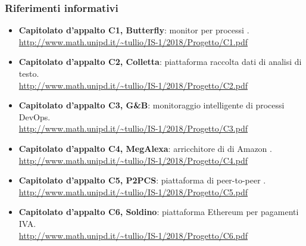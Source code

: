         \subsubsection{Riferimenti informativi}
            \begin{itemize}
                \item \textbf{Capitolato d'appalto C1, Butterfly}:
                    monitor per processi . \\
                    \url{http://www.math.unipd.it/~tullio/IS-1/2018/Progetto/C1.pdf}
                \item \textbf{Capitolato d'appalto C2, Colletta}:
                    piattaforma raccolta dati di analisi di testo. \\
                    \url{http://www.math.unipd.it/~tullio/IS-1/2018/Progetto/C2.pdf}
                \item \textbf{Capitolato d'appalto C3, G\&B}:
                    monitoraggio intelligente di processi DevOps. \\
                    \url{http://www.math.unipd.it/~tullio/IS-1/2018/Progetto/C3.pdf}
                \item \textbf{Capitolato d'appalto C4, MegAlexa}:
                    arricchitore di  di Amazon . \\
                    \url{http://www.math.unipd.it/~tullio/IS-1/2018/Progetto/C4.pdf}
                \item \textbf{Capitolato d'appalto C5, P2PCS}:
                    piattaforma di peer-to-peer . \\
                    \url{http://www.math.unipd.it/~tullio/IS-1/2018/Progetto/C5.pdf}
                \item \textbf{Capitolato d'appalto C6, Soldino}:
                    piattaforma Ethereum per pagamenti IVA. \\
                    \url{http://www.math.unipd.it/~tullio/IS-1/2018/Progetto/C6.pdf}
            \end{itemize}
